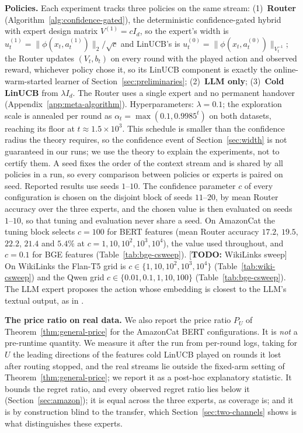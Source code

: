 \documentclass{article}
\theoremstyle{definition}
\theoremstyle{remark}
\theoremstyle{remark}
\newcommand{\todo}[1]{\textcolor{red!70!black}{[\textbf{TODO:} #1]}}
\begin{document}
\textbf{Policies.} Each experiment tracks three policies on the same stream:
(1)~\textbf{Router} (Algorithm~\ref{alg:confidence-gated}), the deterministic
confidence-gated hybrid with expert design matrix $V^{(1)}=cI_d$, so the
expert's width is $u_t^{(1)}=\|\phi(x_t,a_t^{(1)})\|_2/\sqrt c$ and LinUCB's is
$u_t^{(0)}=\|\phi(x_t,a_t^{(0)})\|_{V_t^{-1}}$; the Router updates $(V_t,b_t)$ on
every round with the played action and observed reward, whichever policy
chose it, so its LinUCB component is exactly the online-warm-started learner
of Section~\ref{sec:preliminaries}; (2)~\textbf{LLM only}; (3)~\textbf{Cold
LinUCB} from $\lambda I_d$. The Router uses a single expert and no permanent
handover (Appendix~\ref{app:meta-algorithm}). Hyperparameters: $\lambda=0.1$;
the exploration scale is annealed per round as $\alpha_t=\max(0.1,0.9985^t)$
on both datasets, reaching its floor at $t\approx1.5\times10^3$. This schedule
is smaller than the confidence radius the theory requires, so the confidence
event of Section~\ref{sec:width} is not guaranteed in our runs; we use the
theory to explain the experiments, not to certify them. A seed fixes the order of the
context stream and is shared by all policies in a run, so every comparison
between policies or experts is paired on seed. Reported results use
seeds $1$--$10$. The confidence parameter $c$ of every configuration is chosen
on the disjoint block of seeds $11$--$20$, by mean Router accuracy over the
three experts, and the chosen value is then evaluated on seeds $1$--$10$, so
that tuning and evaluation never share a seed. On AmazonCat the tuning block
selects $c=100$ for BERT features (mean Router accuracy $17.2$, $19.5$,
$22.2$, $21.4$ and $5.4\%$ at $c=1,10,10^2,10^3,10^4$), the value used
throughout, and $c=0.1$ for BGE features (Table~\ref{tab:bge-csweep}).
\todo{WikiLinks sweep} On WikiLinks the Flan-T5 grid is
$c\in\{1,10,10^2,10^3,10^4\}$ (Table~\ref{tab:wiki-csweep}) and the Qwen grid
$c\in\{0.01,0.1,1,10,100\}$ (Table~\ref{tab:bge-csweep}).
The LLM expert proposes the action whose embedding is closest to the LLM's
textual output, as in \cite{chen2024llmdecision}.

\textbf{The price ratio on real data.} We also report the price ratio $P_U$ of
Theorem~\ref{thm:general-price} for the AmazonCat BERT configurations. It is
\emph{not} a pre-runtime quantity. We measure it after the run from per-round
logs, taking for $U$ the leading directions of the features cold LinUCB played
on rounds it lost after routing stopped, and the real streams lie outside the
fixed-arm setting of Theorem~\ref{thm:general-price}; we report it as a
post-hoc explanatory statistic. It bounds the regret ratio, and every observed
regret ratio lies below it (Section~\ref{sec:amazon}); it is equal across the
three experts, as coverage is; and it is by construction blind to the
transfer, which Section~\ref{sec:two-channels} shows is what distinguishes
these experts.
\end{document}
